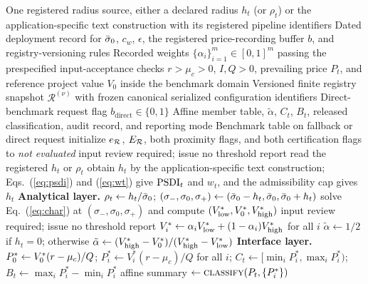 \begin{algorithm*}[!t]
\caption{Gate-level member thresholds and safeguarded classification.}
\label{alg:gate}
\footnotesize
\begin{algorithmic}[1]
\Require One registered radius source, either a declared radius $h_t$ (or $\rho_t$) or the application-specific text construction with its registered pipeline identifiers
\Require Dated deployment record for $\bar{\sigma}_0$, $c_w$, $\epsilon$, the registered price-recording buffer $b$, and registry-versioning rules
\Require Recorded weights $\{\alpha_i\}_{i=1}^{m}\in[0,1]^{m}$ passing the prespecified input-acceptance checks 
\Require $r>\mu_c>0$, $I,Q>0$, prevailing price $P_t$, and reference project value $V_0$ inside the benchmark domain
\Require Versioned finite registry snapshot $\mathcal{R}^{(\nu)}$ with frozen canonical serialized configuration identifiers
\Require Direct-benchmark request flag $b_{\mathrm{direct}}\in\{0,1\}$
\Ensure Affine member table, $\tilde{\alpha}$, $C_t$, $B_t$, released classification, audit record, and reporting mode
\Ensure Benchmark table on fallback or direct request
\State initialize $e_{\mathcal{R}}$, $E_{\mathcal{R}}$, both proximity flags, and both certification flags to \emph{not evaluated} 
  \State \Return input review required; issue no threshold report
\EndIf
{}
  \State read the registered $h_t$ or $\rho_t$
\Else
  \State obtain $h_t$ by the application-specific text construction; Eqs.~(\ref{eq:psdi}) and (\ref{eq:wt}) give $\mathrm{PSDI}_t$ and $w_t$, and the admissibility cap gives $h_t$ 
\EndIf
\State \textbf{Analytical layer.} $\rho_t\gets h_t/\bar{\sigma}_0$; $(\sigma_{-},\sigma_0,\sigma_{+})\gets(\bar{\sigma}_0-h_t,\bar{\sigma}_0,\bar{\sigma}_0+h_t)$
\State solve Eq.~(\ref{eq:char}) at $(\sigma_{-},\sigma_0,\sigma_{+})$ and compute $(V^{*}_{\mathrm{low}},V^{*}_{0},V^{*}_{\mathrm{high}})$
  \State \Return input review required; issue no threshold report 
\EndIf
\State $V^{*}_{i}\gets\alpha_iV^{*}_{\mathrm{low}}+(1-\alpha_i)V^{*}_{\mathrm{high}}$ for all $i$
\State $\tilde{\alpha}\gets1/2$ if $h_t=0$; otherwise $\tilde{\alpha}\gets(V^{*}_{\mathrm{high}}-V^{*}_{0})/(V^{*}_{\mathrm{high}}-V^{*}_{\mathrm{low}})$
\State \textbf{Interface layer.} $P^{*}_{0}\gets V^{*}_{0}(r-\mu_c)/Q$; $P^{*}_{i}\gets V^{*}_{i}(r-\mu_c)/Q$ for all $i$; $C_t\gets[\min_iP^{*}_{i},\max_iP^{*}_{i})$; $B_t\gets\max_iP^{*}_{i}-\min_iP^{*}_{i}$
\State affine summary $\gets\textsc{classify}(P_t,\{P^{*}_{i}\})$ 

\end{algorithmic}
\end{algorithm*}
